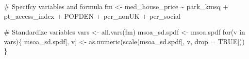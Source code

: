 \documentclass[
  letterpaper,
  DIV=11,
  numbers=noendperiod]{scrreprt}
\newenvironment{Shaded}{\begin{snugshade}}{\end{snugshade}}
\newcommand{\AttributeTok}[1]{\textcolor[rgb]{0.40,0.45,0.13}{#1}}
\newcommand{\CommentTok}[1]{\textcolor[rgb]{0.37,0.37,0.37}{#1}}
\newcommand{\ConstantTok}[1]{\textcolor[rgb]{0.56,0.35,0.01}{#1}}
\newcommand{\ControlFlowTok}[1]{\textcolor[rgb]{0.00,0.23,0.31}{#1}}
\newcommand{\FunctionTok}[1]{\textcolor[rgb]{0.28,0.35,0.67}{#1}}
\newcommand{\NormalTok}[1]{\textcolor[rgb]{0.00,0.23,0.31}{#1}}
\newcommand{\OtherTok}[1]{\textcolor[rgb]{0.00,0.23,0.31}{#1}}
\newcommand{\SpecialCharTok}[1]{\textcolor[rgb]{0.37,0.37,0.37}{#1}}
\begin{document}
\begin{Shaded}
\begin{Highlighting}[]
\CommentTok{\# Specifcy variables and formula}
\NormalTok{fm }\OtherTok{\textless{}{-}}\NormalTok{ med\_house\_price }\SpecialCharTok{\textasciitilde{}}\NormalTok{ park\_kmsq }\SpecialCharTok{+}\NormalTok{ pt\_access\_index }\SpecialCharTok{+}\NormalTok{ POPDEN }\SpecialCharTok{+}\NormalTok{ per\_nonUK }\SpecialCharTok{+}\NormalTok{ per\_social}

\CommentTok{\# Standardize variables}
\NormalTok{vars }\OtherTok{\textless{}{-}} \FunctionTok{all.vars}\NormalTok{(fm)}
\NormalTok{msoa\_sd.spdf }\OtherTok{\textless{}{-}}\NormalTok{ msoa.spdf}
\ControlFlowTok{for}\NormalTok{(v }\ControlFlowTok{in}\NormalTok{ vars)\{}
\NormalTok{  msoa\_sd.spdf[, v] }\OtherTok{\textless{}{-}} \FunctionTok{as.numeric}\NormalTok{(}\FunctionTok{scale}\NormalTok{(msoa\_sd.spdf[, v, }\AttributeTok{drop =} \ConstantTok{TRUE}\NormalTok{]))}
\NormalTok{\}}
\end{Highlighting}
\end{Shaded}
\end{document}
